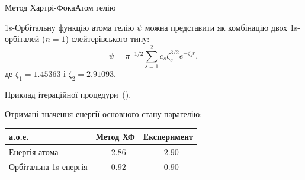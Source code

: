 \documentclass[10pt]{beamer}
\begin{document}
\begin{frame}{Метод Хартрі-Фока}{Атом гелію}
	{\scriptsize {}}

	\medskip

	1s-Орбітальну функцію атома гелію $\psi$ можна представити як комбінацію двох 1s-орбіталей ($n = 1$) слейтерівського типу:
	\begin{equation*}\label{}
		\psi = \pi^{-1/2}\sum\limits_{s = 1}^2 c_s \zeta_s^{3/2}e^{-\zeta_s r},
	\end{equation*}
	де $\zeta_1 = 1.45363$ і $\zeta_2 = 2.91093$.

	\medskip

	{\scriptsize Приклад ітераційної процедури~().}

	\medskip

	Отримані значення енергії основного стану парагелію:

	\begin{center}\footnotesize
		\begin{tabular}{lcc}
			\toprule
			а.о.е.                & Метод ХФ & Експеримент \\
			\midrule
			Енергія атома         & $-2.86$  & $-2.90$     \\

			Орбітальна 1s енергія & $-0.92$  & $-0.90$     \\
			\bottomrule
		\end{tabular}
	\end{center}

\end{frame}
\end{document}
